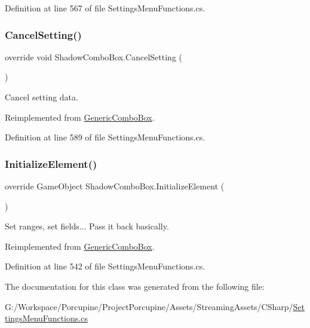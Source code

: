 Definition at line 567 of file Settings\+Menu\+Functions.\+cs.

\mbox{\label{class_shadow_combo_box_a8ab8daef08695bae23b99fd41ce1f6c1}} 
\subsubsection{\texorpdfstring{Cancel\+Setting()}{CancelSetting()}}
{\footnotesize\ttfamily override void Shadow\+Combo\+Box.\+Cancel\+Setting (\begin{DoxyParamCaption}{ }\end{DoxyParamCaption})\hspace{0.3cm}{\ttfamily [virtual]}}



Cancel setting data. 



Reimplemented from \hyperlink{class_generic_combo_box_a0949a84cf1e33d13346cb90597e005ce}{Generic\+Combo\+Box}.



Definition at line 589 of file Settings\+Menu\+Functions.\+cs.

\mbox{\label{class_shadow_combo_box_ae74c360bfe5007aa56efd66e1d016a74}} 
\subsubsection{\texorpdfstring{Initialize\+Element()}{InitializeElement()}}
{\footnotesize\ttfamily override Game\+Object Shadow\+Combo\+Box.\+Initialize\+Element (\begin{DoxyParamCaption}{ }\end{DoxyParamCaption})\hspace{0.3cm}{\ttfamily [virtual]}}



Set ranges, set fields... Pass it back basically. 



Reimplemented from \hyperlink{class_generic_combo_box_ae1800a7c68d3af046a2b147e117437ff}{Generic\+Combo\+Box}.



Definition at line 542 of file Settings\+Menu\+Functions.\+cs.



The documentation for this class was generated from the following file\+:\begin{DoxyCompactItemize}
\item 
G\+:/\+Workspace/\+Porcupine/\+Project\+Porcupine/\+Assets/\+Streaming\+Assets/\+C\+Sharp/\hyperlink{_settings_menu_functions_8cs}{Settings\+Menu\+Functions.\+cs}\end{DoxyCompactItemize}
